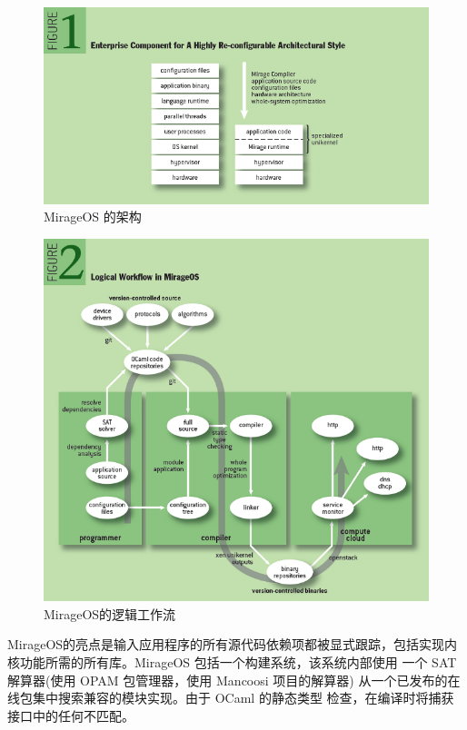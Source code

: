\documentclass{../runikraft-report}
\begin{document}
\begin{figure}[!hbt]
\includegraphics[width=\linewidth]{pictures/figure1.png}
\caption{MirageOS 的架构}\label{fig:mirage-fig1}
\end{figure}

\begin{figure}[!hbt]
\includegraphics[width=\linewidth]{pictures/figure2.png}
\caption{MirageOS的逻辑工作流}\label{fig:mirage-fig2}
\end{figure}

MirageOS的亮点是输入应用程序的所有源代码依赖项都被显式跟踪，包括实现内
核功能所需的所有库。MirageOS 包括一个构建系统，该系统内部使用
一个 SAT 解算器(使用 OPAM 包管理器，使用 Mancoosi 项目的解算器)
从一个已发布的在线包集中搜索兼容的模块实现。由于 OCaml 的静态类型
检查，在编译时将捕获接口中的任何不匹配。
\end{document}
